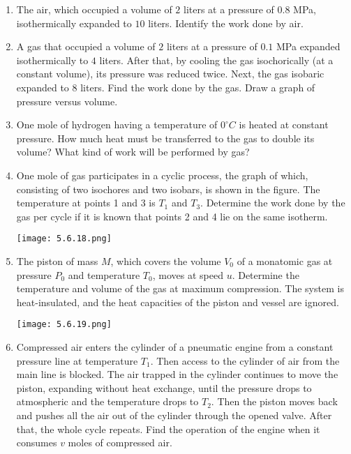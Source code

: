 \documentclass{article}
\begin{document}
\begin{enumerate}[label=5.6.\arabic*]
\item The air, which occupied a volume of $2$ liters at a pressure of $0.8$ MPa, isothermically expanded to $10$ liters. Identify the work done by air.

\item A gas that occupied a volume of $2$ liters at a pressure of $0.1$ MPa expanded isothermically to $4$ liters. After that, by cooling the gas isochorically (at a constant volume), its pressure was reduced twice. Next, the gas isobaric expanded to $8$ liters. Find the work done by the gas. Draw a graph of pressure versus volume.

\item One mole of hydrogen having a temperature of $0^\circ C$ is heated at constant pressure. How much heat must be transferred to the gas to double its volume? What kind of work will be performed by gas?

\item One mole of gas participates in a cyclic process, the graph of which, consisting of two isochores and two isobars, is shown in the figure. The temperature at points 1 and 3 is $T_1$ and $T_3$. Determine the work done by the gas per cycle if it is known that points 2 and 4 lie on the same isotherm.

\begin{center}
    \texttt{[image: 5.6.18.png]}
\end{center}


\item The piston of mass $M$, which covers the volume $V_0$ of a monatomic gas at pressure $P_0$ and temperature $T_0$, moves at speed $u$. Determine the temperature and volume of the gas at maximum compression. The system is heat-insulated, and the heat capacities of the piston and vessel are ignored.

\begin{center}
    \texttt{[image: 5.6.19.png]}
\end{center}


\item Compressed air enters the cylinder of a pneumatic engine from a constant pressure line at temperature $T_1$. Then access to the cylinder of air from the main line is blocked. The air trapped in the cylinder continues to move the piston, expanding without heat exchange, until the pressure drops to atmospheric and the temperature drops to $T_2$. Then the piston moves back and pushes all the air out of the cylinder through the opened valve. After that, the whole cycle repeats. Find the operation of the engine when it consumes $v$ moles of compressed air.


\end{enumerate}
\end{document}
